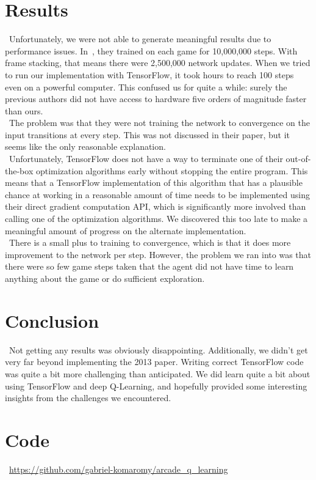 \documentclass[conference]{IEEEtran}
\begin{document}
\section{Results}
\noindent\ Unfortunately, we were not able to generate meaningful results due
to performance issues. In~\cite{mnih2013playing}, they trained on each game for
10,000,000 steps. With frame stacking, that means there were 2,500,000 network
updates.  When we tried to run our implementation with TensorFlow, it took
hours to reach 100 steps even on a powerful computer. This confused us for
quite a while: surely the previous authors did not have access to hardware five
orders of magnitude faster than ours.\\
\indent\ The problem was that they were not training the network to convergence
on the input transitions at every step. This was not discussed in their paper,
but it seems like the only reasonable explanation.\\
\indent\ Unfortunately, TensorFlow does not have a way to terminate one of
their out-of-the-box optimization algorithms early without stopping the entire
program. This means that a TensorFlow implementation of this algorithm that has
a plausible chance at working in a reasonable amount of time needs to be
implemented using their direct gradient computation API, which is significantly
more involved than calling one of the optimization algorithms. We discovered
this too late to make a meaningful amount of progress on the alternate
implementation.\\
\indent\ There is a small plus to training to convergence, which is that it
does more improvement to the network per step. However, the problem we ran into
was that there were so few game steps taken that the agent did not have time to
learn anything about the game or do sufficient exploration.

\section{Conclusion}
\noindent\ Not getting any results was obviously disappointing. Additionally,
we didn't get very far beyond implementing the 2013 paper. Writing correct
TensorFlow code was quite a bit more challenging than anticipated. We did learn
quite a bit about using TensorFlow and deep Q-Learning, and hopefully provided
some interesting insights from the challenges we encountered.

\section{Code}
\noindent\ \url{https://github.com/gabriel-komaromy/arcade_q_learning}
\end{document}
